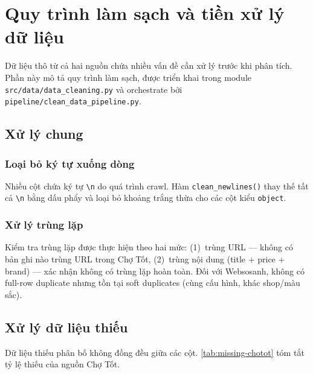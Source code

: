 \section{Quy trình làm sạch và tiền xử lý dữ liệu}
\label{sec:data-cleaning}

Dữ liệu thô từ cả hai nguồn chứa nhiều vấn đề cần xử lý trước khi phân tích. Phần này mô tả quy trình làm sạch, được triển khai trong module \texttt{src/data/data\_cleaning.py} và orchestrate bởi \texttt{pipeline/clean\_data\_pipeline.py}.

\subsection{Xử lý chung}

\subsubsection{Loại bỏ ký tự xuống dòng}
Nhiều cột chứa ký tự \texttt{\textbackslash n} do quá trình crawl. Hàm \texttt{clean\_newlines()} thay thế tất cả \texttt{\textbackslash n} bằng dấu phẩy và loại bỏ khoảng trắng thừa cho các cột kiểu \texttt{object}.

\subsubsection{Xử lý trùng lặp}
Kiểm tra trùng lặp được thực hiện theo hai mức: (1)~trùng URL --- không có bản ghi nào trùng URL trong Chợ Tốt, (2)~trùng nội dung (title + price + brand) --- xác nhận không có trùng lặp hoàn toàn. Đối với Websosanh, không có full-row duplicate nhưng tồn tại soft duplicates (cùng cấu hình, khác shop/màu sắc).

\subsection{Xử lý dữ liệu thiếu}

Dữ liệu thiếu phân bố không đồng đều giữa các cột. \cref{tab:missing-chotot} tóm tắt tỷ lệ thiếu của nguồn Chợ Tốt.


